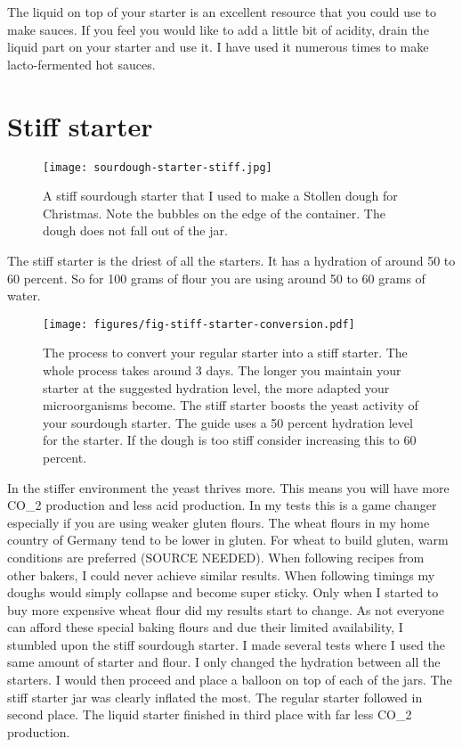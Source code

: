 The liquid on top of your starter is an excellent resource that you could use
to make sauces. If you feel you would like to add a little bit of acidity,
drain the liquid part on your starter and use it. I have used it numerous
times to make lacto-fermented hot sauces.

\section{Stiff starter}
\label{section:stiff-starter}

\begin{figure}[!htb]
  \texttt{[image: sourdough-starter-stiff.jpg]}
  \caption{A stiff sourdough starter that I used to make a Stollen dough for Christmas. Note
  the bubbles on the edge of the container. The dough does not fall out of the jar.}
  \label{fig:stiff-sourdough-starter}
\end{figure}

The stiff starter is the driest of all the starters. It has a hydration of
around 50 to 60 percent. So for 100 grams of flour you are using around 50 to
60 grams of water.

\begin{figure}[!htb]
  \texttt{[image: figures/fig-stiff-starter-conversion.pdf]}
  \caption{The process to convert your regular starter into a stiff starter. The whole
  process takes around 3 days. The longer you maintain your starter at the
  suggested hydration level, the more adapted your microorganisms become. The
  stiff starter boosts the yeast activity of your sourdough starter.
  The guide uses a 50 percent hydration level for the starter. If the dough is too stiff
  consider increasing this to 60 percent.}
  \label{fig:stiff-starter-conversion}
\end{figure}

In the stiffer environment the yeast thrives more. This means you will have
more CO_{2} production and less acid production. In my tests this is a game
changer especially if you are using weaker gluten flours. The wheat flours in
my home country of Germany tend to be lower in gluten. For wheat to build gluten, warm conditions
are preferred (SOURCE NEEDED). When following recipes from other bakers, I
could never achieve similar results. When following timings my doughs would
simply collapse and become super sticky. Only when I started to buy more
expensive wheat flour did my results start to change. As not everyone can afford
these special baking flours and due their limited availability, I stumbled upon the
stiff sourdough starter. I made several tests where I used the same amount of
starter and flour. I only changed the hydration between all the starters. I
would then proceed and place a balloon on top of each of the jars. The stiff
starter jar was clearly inflated the most. The regular starter
followed in second place. The liquid starter finished in third place with far less CO_{2}
production.


